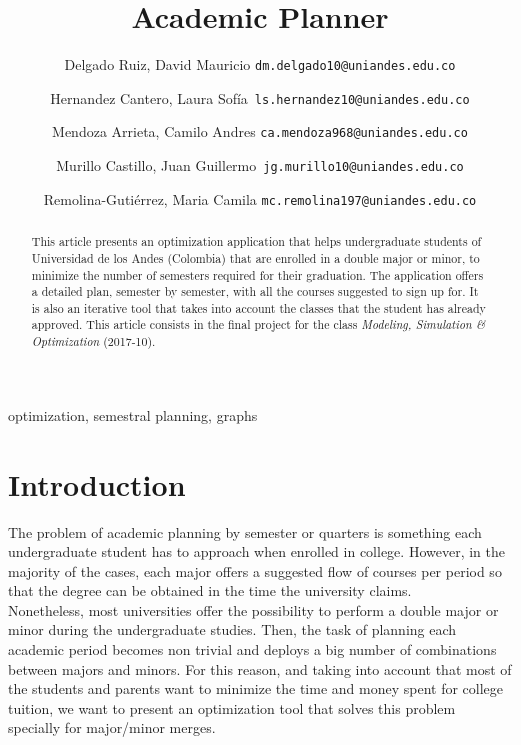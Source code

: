 \documentclass[journal]{IEEEtran}
\begin{document}
\title{Academic Planner}

\author{
    Delgado Ruiz, David Mauricio \texttt{dm.delgado10@uniandes.edu.co}\\ \and 
	Hernandez Cantero, Laura Sof\'ia\ \texttt{ls.hernandez10@uniandes.edu.co}\\ \and
	Mendoza Arrieta, Camilo Andres \texttt{ca.mendoza968@uniandes.edu.co}\\ \and
	Murillo Castillo, Juan Guillermo\ \texttt{jg.murillo10@uniandes.edu.co}\\ \and
  	Remolina-Guti\'errez, Maria Camila \texttt{mc.remolina197@uniandes.edu.co} 
}

\maketitle

\begin{abstract}
This article presents an optimization application that helps undergraduate students of Universidad de los Andes (Colombia) that are enrolled in a double major or minor, to minimize the number of semesters required for their graduation. The application offers a detailed plan, semester by semester, with all the courses suggested to sign up for. It is also an iterative tool that takes into account the classes that the student has already approved. This article consists in the final project for the class \textit{Modeling, Simulation \& Optimization} (2017-10).
\end{abstract}

\begin{IEEEkeywords}
	optimization, semestral planning, graphs
\end{IEEEkeywords}

\section{Introduction}
The problem of academic planning by semester or quarters is something each undergraduate student has to approach when enrolled in college. However, in the majority of the cases, each major offers a suggested flow of courses per period so that the degree can be obtained in the time the university claims. \\

Nonetheless, most universities offer the possibility to perform a double major or minor during the undergraduate studies. Then, the task of planning each academic period becomes non trivial and deploys a big number of combinations between majors and minors. For this reason, and taking into account that most of the students and parents want to minimize the time and money spent for college tuition, we want to present an optimization tool that solves this problem specially for major/minor merges. \\
\end{document}

